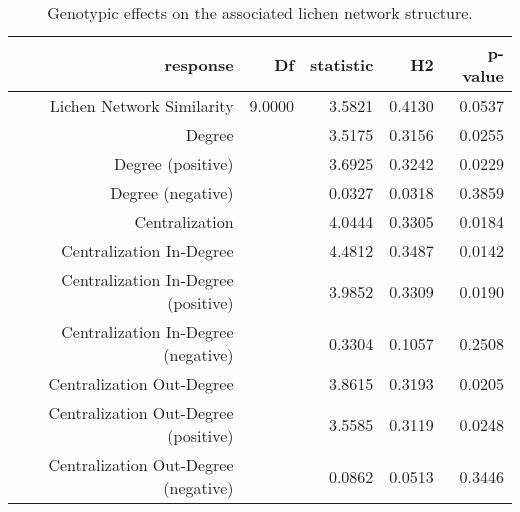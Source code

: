 \begin{table}[ht]
\centering
\begin{tabular}{rrrrr}
  \hline
response & Df & statistic & H2 & p-value \\ 
  \hline
Lichen Network Similarity & 9.0000 & 3.5821 & 0.4130 & 0.0537 \\ 
  Degree &  & 3.5175 & 0.3156 & 0.0255 \\ 
  Degree (positive) &  & 3.6925 & 0.3242 & 0.0229 \\ 
  Degree (negative) &  & 0.0327 & 0.0318 & 0.3859 \\ 
  Centralization &  & 4.0444 & 0.3305 & 0.0184 \\ 
  Centralization In-Degree &  & 4.4812 & 0.3487 & 0.0142 \\ 
  Centralization In-Degree (positive) &  & 3.9852 & 0.3309 & 0.0190 \\ 
  Centralization In-Degree (negative) &  & 0.3304 & 0.1057 & 0.2508 \\ 
  Centralization Out-Degree &  & 3.8615 & 0.3193 & 0.0205 \\ 
  Centralization Out-Degree (positive) &  & 3.5585 & 0.3119 & 0.0248 \\ 
  Centralization Out-Degree (negative) &  & 0.0862 & 0.0513 & 0.3446 \\ 
   \hline
\end{tabular}
\caption{Genotypic effects on the associated lichen network structure.} 
\label{tab:h2_net}
\end{table}
